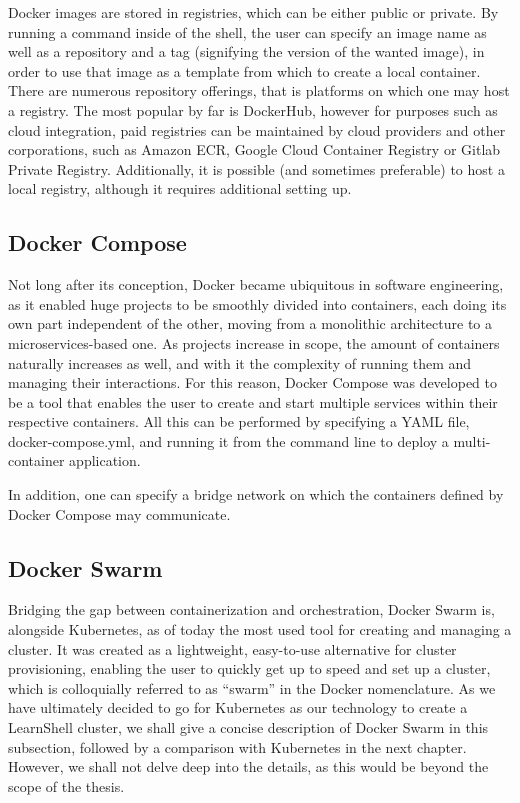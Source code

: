 \documentclass[thesis=B,english]{FITthesis}[2019/12/23]
\begin{document}
Docker images are stored in registries, which can be either public or private. By running a command inside of the shell, the user can specify an image name as well as a repository and a tag (signifying the version of the wanted image), in order to use that image as a template from which to create a local container. There are numerous repository offerings, that is platforms on which one may host a registry. The most popular by far is DockerHub, however for purposes such as cloud integration, paid registries can be maintained by cloud providers and other corporations, such as Amazon ECR, Google Cloud Container Registry or Gitlab Private Registry. Additionally, it is possible (and sometimes preferable) to host a local registry, although it requires additional setting up.

\subsection{Docker Compose}

Not long after its conception, Docker became ubiquitous in software engineering, as it enabled huge projects to be smoothly divided into containers, each doing its own part independent of the other, moving from a monolithic architecture to a microservices-based one. As projects increase in scope, the amount of containers naturally increases as well, and with it the complexity of running them and managing their interactions. For this reason, Docker Compose was developed to be a tool that enables the user to create and start multiple services within their respective containers. All this can be performed by specifying a YAML file, docker-compose.yml, and running it from the command line to deploy a multi-container application. \cite{docker-compose-docs}

In addition, one can specify a bridge network on which the containers defined by Docker Compose may communicate.

\subsection{Docker Swarm}

Bridging the gap between containerization and orchestration, Docker Swarm is, alongside Kubernetes, as of today the most used tool for creating and managing a cluster. It was created as a lightweight, easy-to-use alternative for cluster provisioning, enabling the user to quickly get up to speed and set up a cluster, which is colloquially referred to as “swarm” in the Docker nomenclature. As we have ultimately decided to go for Kubernetes as our technology to create a LearnShell cluster, we shall give a concise description of Docker Swarm in this subsection, followed by a comparison with Kubernetes in the next chapter. However, we shall not delve deep into the details, as this would be beyond the scope of the thesis.
\end{document}
